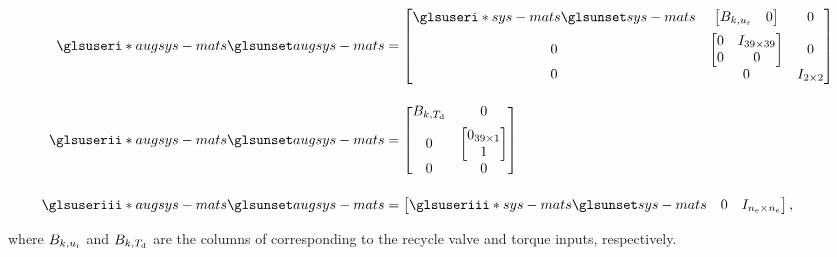 \begin{equation}
  \begin{split}
    \ga{augsys-mats} & =
    \begin{bmatrix}
      \ga{sys-mats} & \begin{bmatrix} B_{k,u\ut{r}} & 0 \end{bmatrix} & 0\\[0.5em]
      0 & \begin{bmatrix} 0 & I_{39\times 39}\\ 0 & 0\end{bmatrix} & 0\\[0.5em]
      0 & 0 & I_{2\times 2}
    \end{bmatrix}\\[1em]
%
    \gb{augsys-mats} & = 
    \begin{bmatrix}
      B_{k,T\ut{d}} & 0\\[0.5em]
      0 & \begin{bmatrix} 0_{39\times 1}\\ 1 \end{bmatrix} \\[0.5em]
      0 & 0
    \end{bmatrix}\\[1em]
%
    \gc{augsys-mats} & = \begin{bmatrix}
      \gc{sys-mats} & 0 & I_{n\ut{e} \times n\ut{e}}
    \end{bmatrix},
  \end{split}
\end{equation}

\noindent where $B_{k,u_\text{r}}$ and $B_{k,T_\text{d}}$ are the columns of  corresponding to the recycle valve and torque inputs, respectively.

